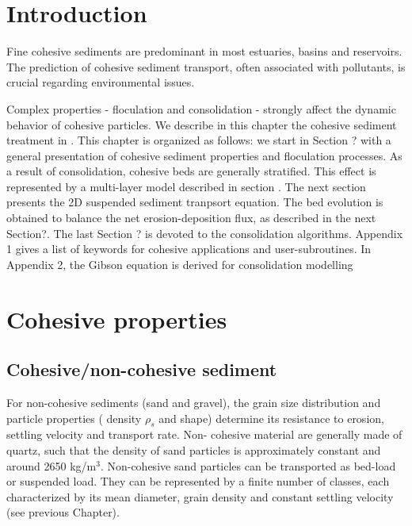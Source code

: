 
\section{Introduction}

Fine cohesive sediments are predominant in most estuaries, basins and reservoirs.
The prediction of cohesive sediment transport, often associated with pollutants, is crucial
regarding environmental issues. 

Complex properties - floculation and consolidation - strongly affect the dynamic behavior of cohesive particles. 
We describe in this chapter the cohesive sediment treatment in \sisyphe.
This chapter is organized as follows:
we start in Section ? with a general presentation of cohesive sediment properties and floculation processes.
As a result of consolidation, cohesive beds are generally stratified. This effect is represented by a multi-layer model described in section . The next section presents the 2D suspended sediment tranpsort equation. 
The bed evolution is obtained to balance the net erosion-deposition flux, as described in the next Section?.
The last Section ? is devoted to the consolidation algorithms.
Appendix 1 gives a list of keywords for cohesive applications and user-subroutines. In
Appendix 2, the Gibson equation is derived for consolidation modelling


\section{Cohesive properties}

\subsection{Cohesive/non-cohesive sediment}


For non-cohesive sediments (sand and gravel), the grain size distribution and particle properties (
 density $\rho_s$ and shape) determine its
resistance to erosion, settling velocity and transport rate. Non-
cohesive material are generally made of quartz, such that the density of
sand particles is approximately constant and around 2650 kg/m$^{3}$. 
Non-cohesive sand particles can be transported as bed-load or suspended load. 
They can be represented by a finite number of
classes, each characterized by its mean diameter, grain density and constant
settling velocity (see previous Chapter). 


